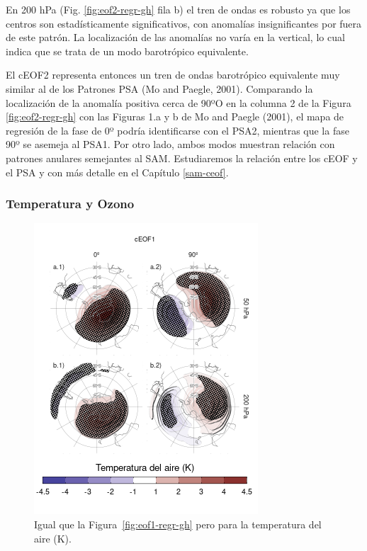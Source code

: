 \documentclass[12pt,oneside]{reedthesis}
\begin{document}
En 200 hPa (Fig. \ref{fig:eof2-regr-gh} fila b) el tren de ondas es robusto ya que los centros son estadísticamente significativos, con anomalías insignificantes por fuera de este patrón.
La localización de las anomalías no varía en la vertical, lo cual indica que se trata de un modo barotrópico equivalente.

El cEOF2 representa entonces un tren de ondas barotrópico equivalente muy similar al de los Patrones PSA (Mo and Paegle, 2001).
Comparando la localización de la anomalía positiva cerca de 90ºO en la columna 2 de la Figura \ref{fig:eof2-regr-gh} con las Figuras 1.a y b de Mo and Paegle (2001), el mapa de regresión de la fase de 0º podría identificarse con el PSA2, mientras que la fase 90º se asemeja al PSA1.
Por otro lado, ambos modos muestran relación con patrones anulares semejantes al SAM.
Estudiaremos la relación entre los cEOF y el PSA y con más detalle en el Capítulo \ref{sam-ceof}.

\hypertarget{temperatura-y-ozono}{%
\subsubsection{Temperatura y Ozono}\label{temperatura-y-ozono}}



\begin{figure}
\includegraphics{figures/20-ceofs/eof1-regr-t-1} \caption{Igual que la Figura~\ref{fig:eof1-regr-gh} pero para la temperatura del aire (K).}\label{fig:eof1-regr-t}
\end{figure}
\end{document}
